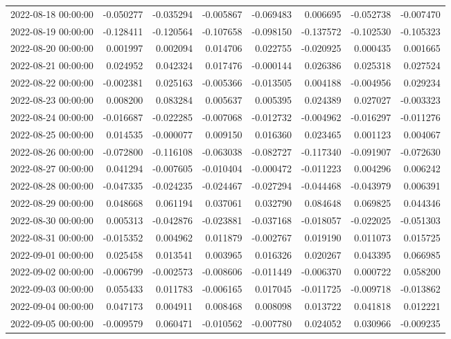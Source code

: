 \begin{tabular}{lrrrrrrr}
2022-08-18 00:00:00 & -0.050277 & -0.035294 & -0.005867 & -0.069483 & 0.006695 & -0.052738 & -0.007470 \\
2022-08-19 00:00:00 & -0.128411 & -0.120564 & -0.107658 & -0.098150 & -0.137572 & -0.102530 & -0.105323 \\
2022-08-20 00:00:00 & 0.001997 & 0.002094 & 0.014706 & 0.022755 & -0.020925 & 0.000435 & 0.001665 \\
2022-08-21 00:00:00 & 0.024952 & 0.042324 & 0.017476 & -0.000144 & 0.026386 & 0.025318 & 0.027524 \\
2022-08-22 00:00:00 & -0.002381 & 0.025163 & -0.005366 & -0.013505 & 0.004188 & -0.004956 & 0.029234 \\
2022-08-23 00:00:00 & 0.008200 & 0.083284 & 0.005637 & 0.005395 & 0.024389 & 0.027027 & -0.003323 \\
2022-08-24 00:00:00 & -0.016687 & -0.022285 & -0.007068 & -0.012732 & -0.004962 & -0.016297 & -0.011276 \\
2022-08-25 00:00:00 & 0.014535 & -0.000077 & 0.009150 & 0.016360 & 0.023465 & 0.001123 & 0.004067 \\
2022-08-26 00:00:00 & -0.072800 & -0.116108 & -0.063038 & -0.082727 & -0.117340 & -0.091907 & -0.072630 \\
2022-08-27 00:00:00 & 0.041294 & -0.007605 & -0.010404 & -0.000472 & -0.011223 & 0.004296 & 0.006242 \\
2022-08-28 00:00:00 & -0.047335 & -0.024235 & -0.024467 & -0.027294 & -0.044468 & -0.043979 & 0.006391 \\
2022-08-29 00:00:00 & 0.048668 & 0.061194 & 0.037061 & 0.032790 & 0.084648 & 0.069825 & 0.044346 \\
2022-08-30 00:00:00 & 0.005313 & -0.042876 & -0.023881 & -0.037168 & -0.018057 & -0.022025 & -0.051303 \\
2022-08-31 00:00:00 & -0.015352 & 0.004962 & 0.011879 & -0.002767 & 0.019190 & 0.011073 & 0.015725 \\
2022-09-01 00:00:00 & 0.025458 & 0.013541 & 0.003965 & 0.016326 & 0.020267 & 0.043395 & 0.066985 \\
2022-09-02 00:00:00 & -0.006799 & -0.002573 & -0.008606 & -0.011449 & -0.006370 & 0.000722 & 0.058200 \\
2022-09-03 00:00:00 & 0.055433 & 0.011783 & -0.006165 & 0.017045 & -0.011725 & -0.009718 & -0.013862 \\
2022-09-04 00:00:00 & 0.047173 & 0.004911 & 0.008468 & 0.008098 & 0.013722 & 0.041818 & 0.012221 \\
2022-09-05 00:00:00 & -0.009579 & 0.060471 & -0.010562 & -0.007780 & 0.024052 & 0.030966 & -0.009235 \\

\end{tabular}
